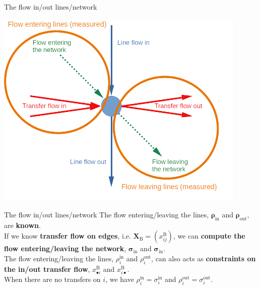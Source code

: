 \documentclass[10pt]{beamer}
\newcommand{\imp}[1]{\textbf{\color{cyan}#1}}
\begin{document}
	
	\begin{frame}{The flow in/out lines/network}
		\begin{center}
			\includegraphics[width=0.9\textwidth]{img/flow_measured.png}
		\end{center}
	\end{frame}
	
	
	\begin{frame}{The flow in/out lines/network}
		The flow entering/leaving the lines, $\bm{\rho}_\text{in}$ and $\bm{\rho}_\text{out}$, are \imp{known}. \\
		\vspace{0.4cm}
		If we know \imp{transfer flow on edges}, i.e. $\mathbf{X}_\text{B} = (x^\text{B}_{ij})$, we can \imp{compute the flow entering/leaving the network}, $\bm{\sigma}_\text{in}$ and $\bm{\sigma}_\text{in}$. \\
		\vspace{0.4cm}
		The flow entering/leaving the lines, $\rho^\text{in}_i$ and $\rho^\text{out}_i$, can also acts as \imp{constraints on the in/out transfer flow}, $x^\text{B}_{\bullet i}$ and $x^\text{B}_{i \bullet}$.\\
		\vspace{0.4cm}
		When there are no transfers on $i$, we have $\rho^\text{in}_i = \sigma^\text{in}_i$ and  $\rho^\text{out}_i = \sigma^\text{out}_i$. \\
	\end{frame}
	
\end{document}
